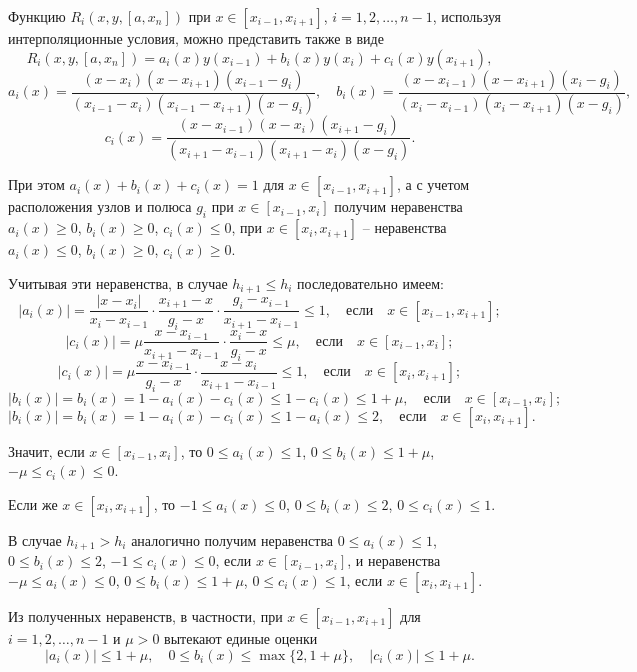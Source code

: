 Функцию $R_i(x,y, [a,x_n])$ при $x\in[x_{i-1},x_{i+1}]$,
$i=1,2,\dots,n-1$, используя интерполяционные условия,  можно представить также в виде
\begin{equation}\label{ark-eq-1.3}
R_i(x,y,[a,x_n])=a_i(x) y(x_{i-1})+b_i(x) y(x_i)+c_i(x) y(x_{i+1}),
\end{equation}
$$
a_i(x)=\frac{(x-x_i)(x-x_{i+1})(x_{i-1}-g_i)}{(x_{i-1}-x_i)(x_{i-1}-x_{i+1})(x-g_i)},\quad
b_i(x)=\frac{(x-x_{i-1})(x-x_{i+1})(x_i-g_i)}{(x_i-x_{i-1})(x_i-x_{i+1})(x-g_i)},
$$
$$
c_i(x)=\frac{(x-x_{i-1})(x-x_i)(x_{i+1}-g_i)}{(x_{i+1}-x_{i-1})(x_{i+1}-x_i)(x-g_i)}.
$$

При этом $a_i(x)+b_i(x)+c_i(x)=1$ для $x\in[x_{i-1}, x_{i+1}]$, а с учетом расположения узлов
и полюса $g_i$ при $x\in [x_{i-1}, x_i]$ получим неравенства $a_i(x)\geqslant 0$,
$b_i(x)\geqslant 0$, $c_i(x)\leqslant 0$, при $x\in[x_i, x_{i+1}]$ -- неравенства
$a_i(x)\leqslant 0$, $b_i(x)\geqslant 0$, $c_i(x)\geqslant 0$.

Учитывая эти неравенства, в случае $h_{i+1}\leqslant h_i$ последовательно имеем:
$$
|a_i(x)|=\frac{|x-x_i|}{x_i-x_{i-1}}\cdot \frac{x_{i+1}-x}{g_i-x}\cdot
 \frac{g_i-x_{i-1}}{x_{i+1}-x_{i-1}}\leqslant 1,\quad \text{если}\quad x\in [x_{i-1},x_{i+1}];
$$
$$
|c_i(x)|=\mu \frac{x-x_{i-1}}{x_{i+1}-x_{i-1}}\cdot \frac{x_i-x}{g_i-x}
\leqslant \mu,\quad \text{если}\quad x\in [x_{i-1},x_i];
$$
$$
|c_i(x)|=\mu \frac{x-x_{i-1}}{g_i-x}\cdot \frac{x-x_i}{x_{i+1}-x_{i-1}}
\leqslant 1,\quad \text{если}\quad x\in [x_i,x_{i+1}];
$$
$$
|b_i(x)|=b_i(x)=1-a_i(x)-c_i(x)\leqslant 1-c_i(x)\leqslant 1+\mu,
\quad \text{если}\quad x\in [x_{i-1},x_i];
$$
$$
|b_i(x)|=b_i(x)=1-a_i(x)-c_i(x)\leqslant 1-a_i(x)\leqslant 2,
\quad \text{если}\quad x\in [x_i,x_{i+1}].
$$

Значит, если $x\in[x_{i-1}, x_i]$, то $0\leqslant a_i(x)\leqslant 1$,
$0\leqslant b_i(x)\leqslant 1+\mu$,  $-\mu\leqslant c_i(x)\leqslant 0$.

Если же $x\in[x_i, x_{i+1}]$, то $-1\leqslant a_i(x)\leqslant 0$,
$ 0\leqslant b_i(x)\leqslant 2$, $0\leqslant c_i(x)\leqslant 1$.

В случае $h_{i+1}>h_i$ аналогично получим неравенства $0\leqslant a_i(x)\leqslant 1$,
$0\leqslant b_i(x)\leqslant 2$,   $-1\leqslant c_i(x)\leqslant 0$, если $x\in[x_{i-1}, x_i]$,
и неравенства $-\mu\leqslant a_i(x)\leqslant 0$, $0\leqslant b_i(x)\leqslant 1+\mu$,
$0\leqslant c_i(x)\leqslant 1$, если $x\in[x_i,x_{i+1}]$.

Из полученных неравенств, в частности, при $x\in[x_{i-1}, x_{i+1}]$ для $i=1,2,\dots,n-1$ и
$\mu>0$ вытекают единые оценки
\begin{equation}\label{ark-eq-1.5}
|a_i(x)|\leqslant 1+\mu,\quad 0\leqslant b_i(x)\leqslant \max\{2,1+\mu\},
\quad |c_i(x)|\leqslant 1+\mu.
\end{equation}


